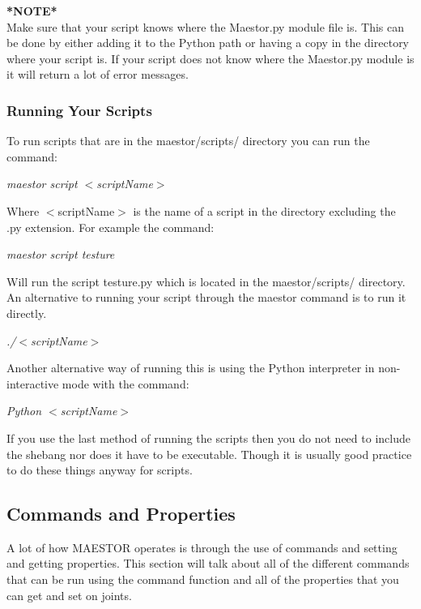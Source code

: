 \documentclass[12pt]{article}
\begin{document}
\noindent \textbf{*NOTE*}\\
\noindent Make sure that your script knows where the Maestor.py module file is. This can be done by either adding it to the Python path or having a copy in the directory where your script is. If your script does not know where the Maestor.py module is it will return a lot of error messages.  

\subsubsection{Running Your Scripts}


To run scripts that are in the maestor/scripts/ directory you can run the command: 

\begin{center}
	\textit{maestor script $<$scriptName$>$}
\end{center}

Where $<$scriptName$>$ is the name of a script in the directory excluding the .py extension. For example the command:

\begin{center}
	\textit{maestor script testure}
\end{center}

Will run the script testure.py which is located in the maestor/scripts/ directory. An alternative to running your script through the maestor command is to run it directly. 

\begin{center}
	\textit{./$<$scriptName$>$}
\end{center}

Another alternative way of running this is using the Python interpreter in non-interactive mode with the command:

\begin{center}
	\textit{Python $<$scriptName$>$}
\end{center}

If you use the last method of running the scripts then you do not need to include the shebang nor does it have to be executable. Though it is usually good practice to do these things anyway for scripts. 

\subsection{Commands and Properties}

A lot of how MAESTOR operates is through the use of commands and setting and getting properties. This section will talk about all of the different commands that can be run using the command function and all of the properties that you can get and set on joints. 
\end{document}
